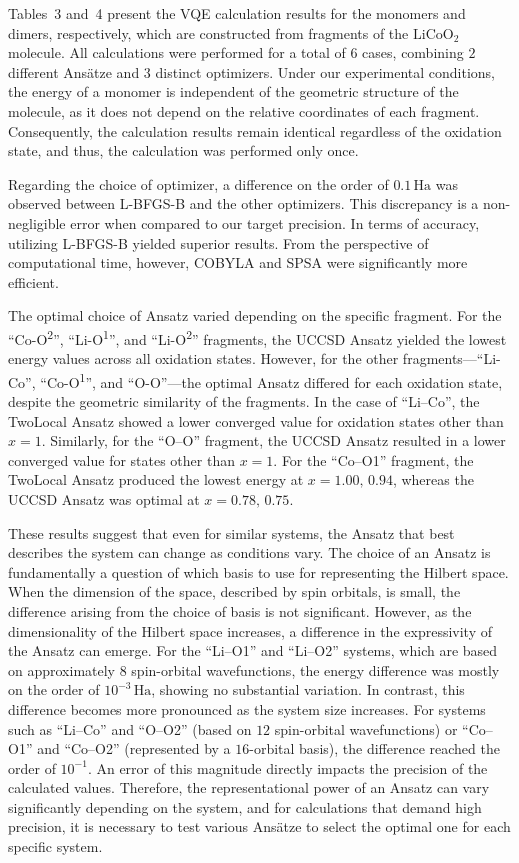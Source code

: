 \documentclass[pdflatex,sn-mathphys-num]{sn-jnl}%
\theoremstyle{thmstyleone}%
\theoremstyle{thmstyletwo}%
\theoremstyle{thmstylethree}%
\begin{document}
Tables~3 and~4 present the VQE calculation results for the monomers and dimers, respectively, which are constructed from fragments of the \(\mathrm{LiCoO_2}\) molecule. All calculations were performed for a total of $6$ cases, combining $2$ different Ans\"{a}tze and $3$ distinct optimizers. Under our experimental conditions, the energy of a monomer is independent of the geometric structure of the molecule, as it does not depend on the relative coordinates of each fragment. Consequently, the calculation results remain identical regardless of the oxidation state, and thus, the calculation was performed only once.

Regarding the choice of optimizer, a difference on the order of \(0.1\,\mathrm{Ha}\) was observed between L-BFGS-B and the other optimizers. This discrepancy is a non-negligible error when compared to our target precision. In terms of accuracy, utilizing L-BFGS-B yielded superior results. From the perspective of computational time, however, COBYLA and SPSA were significantly more efficient.

The optimal choice of Ansatz varied depending on the specific fragment. For the ``Co-O\textsuperscript{2}'', ``Li-O\textsuperscript{1}'', and ``Li-O\textsuperscript{2}'' fragments, the UCCSD Ansatz yielded the lowest energy values across all oxidation states. However, for the other fragments---``Li-Co'', ``Co-O\textsuperscript{1}'', and ``O-O''---the optimal Ansatz differed for each oxidation state, despite the geometric similarity of the fragments. In the case of ``Li--Co'', the TwoLocal Ansatz showed a lower converged value for oxidation states other than \(x=1\). Similarly, for the ``O--O'' fragment, the UCCSD Ansatz resulted in a lower converged value for states other than \(x=1\). For the ``Co--O1'' fragment, the TwoLocal Ansatz produced the lowest energy at \(x=1.00,\,0.94\), whereas the UCCSD Ansatz was optimal at \(x=0.78,\,0.75\).

These results suggest that even for similar systems, the Ansatz that best describes the system can change as conditions vary. The choice of an Ansatz is fundamentally a question of which basis to use for representing the Hilbert space. When the dimension of the space, described by spin orbitals, is small, the difference arising from the choice of basis is not significant. However, as the dimensionality of the Hilbert space increases, a difference in the expressivity of the Ansatz can emerge. For the ``Li--O1'' and ``Li--O2'' systems, which are based on approximately $8$ spin-orbital wavefunctions, the energy difference was mostly on the order of \(10^{-3}\,\mathrm{Ha}\), showing no substantial variation. In contrast, this difference becomes more pronounced as the system size increases. For systems such as ``Li--Co'' and ``O--O2'' (based on $12$ spin-orbital wavefunctions) or ``Co--O1'' and ``Co--O2'' (represented by a $16$-orbital basis), the difference reached the order of \(10^{-1}\). An error of this magnitude directly impacts the precision of the calculated values. Therefore, the representational power of an Ansatz can vary significantly depending on the system, and for calculations that demand high precision, it is necessary to test various Ans\"{a}tze to select the optimal one for each specific system.
\end{document}
